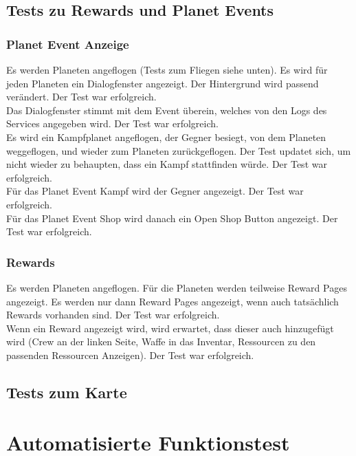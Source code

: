 \documentclass[fontsize=12pt,paper=a4,twoside]{scrartcl}
\begin{document}
\subsection{Tests zu Rewards und Planet Events}
\subsubsection{Planet Event Anzeige}
Es werden Planeten angeflogen (Tests zum Fliegen siehe unten). Es wird für jeden Planeten ein Dialogfenster angezeigt. Der Hintergrund wird passend verändert. Der Test war erfolgreich. \\
Das Dialogfenster stimmt mit dem Event überein, welches von den Logs des Services angegeben wird. Der Test war erfolgreich. \\
Es wird ein Kampfplanet angeflogen, der Gegner besiegt, von dem Planeten weggeflogen, und wieder zum Planeten zurückgeflogen. Der Test updatet sich, um nicht wieder zu behaupten, dass ein Kampf stattfinden würde. Der Test war erfolgreich. \\
Für das Planet Event Kampf wird der Gegner angezeigt. Der Test war erfolgreich. \\
Für das Planet Event Shop wird danach ein Open Shop Button angezeigt. Der Test war erfolgreich. \\
\subsubsection{Rewards}
Es werden Planeten angeflogen. Für die Planeten werden teilweise Reward Pages angezeigt. Es werden nur dann Reward Pages angezeigt, wenn auch tatsächlich Rewards vorhanden sind. Der Test war erfolgreich. \\
Wenn ein Reward angezeigt wird, wird erwartet, dass dieser auch hinzugefügt wird (Crew an der linken Seite, Waffe in das Inventar, Ressourcen zu den passenden Ressourcen Anzeigen). Der Test war erfolgreich. \\
\subsection{Tests zum Karte}
\subsubsection{}

\section{Automatisierte Funktionstest}
\end{document}
